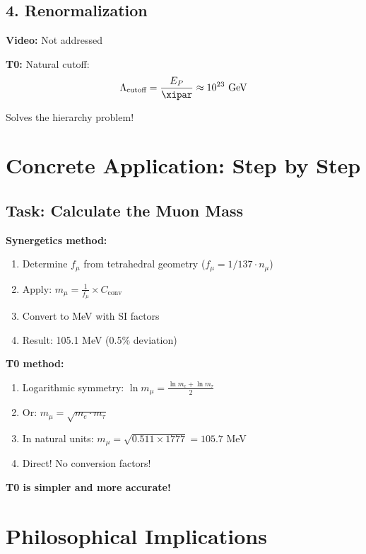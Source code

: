 	\subsection{4. Renormalization}
	
	\textbf{Video:} Not addressed
	
	\textbf{T0:} Natural cutoff:
	\begin{equation}
		\Lambda_{\text{cutoff}} = \frac{E_P}{\xipar} \approx 10^{23} \text{ GeV}
	\end{equation}
	
	Solves the hierarchy problem!
	
	\section{Concrete Application: Step by Step}
	
	\subsection{Task: Calculate the Muon Mass}
	
	\textbf{Synergetics method:}
	\begin{enumerate}
		\item Determine $f_\mu$ from tetrahedral geometry ($f_\mu = 1/137 \cdot n_\mu$)
		\item Apply: $m_\mu = \frac{1}{f_\mu} \times C_{\text{conv}}$
		\item Convert to MeV with SI factors
		\item Result: 105.1 MeV (0.5\% deviation)
	\end{enumerate}
	
	\textbf{T0 method:}
	\begin{enumerate}
		\item Logarithmic symmetry: $\ln m_\mu = \frac{\ln m_e + \ln m_\tau}{2}$
		\item Or: $m_\mu = \sqrt{m_e \cdot m_\tau}$
		\item In natural units: $m_\mu = \sqrt{0.511 \times 1777} = 105.7$ MeV
		\item Direct! No conversion factors!
	\end{enumerate}
	
	\textbf{T0 is simpler and more accurate!}
	
	\section{Philosophical Implications}
	
